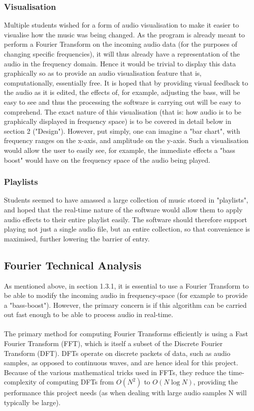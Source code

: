 \subsubsection{Visualisation}
Multiple students wished for a form of audio visualisation to make it easier to visualise how the music was being changed. As the program is already meant to perform a Fourier Transform on the incoming audio data (for the purposes of changing specific frequencies), it will thus already have a representation of the audio in the frequency domain. Hence it would be trivial to display this data graphically so as to provide an audio visualisation feature that is, computationally, essentially free. It is hoped that by providing visual feedback to the audio as it is edited, the effects of, for example, adjusting the bass, will be easy to see and thus the processing the software is carrying out will be easy to comprehend. The exact nature of this visualisation (that is: how audio is to be graphically displayed in frequency space) is to be covered in detail below in section 2 ("Design"). However, put simply, one can imagine  a "bar chart", with frequency ranges on the x-axis, and amplitude on the y-axis. Such a visualisation would allow the user to easily see, for example, the immediate effects a "bass boost" would have on the frequency space of the audio being played.

\subsubsection{Playlists}
Students seemed to have amassed a large collection of music stored in "playlists", and hoped that the real-time nature of the software would allow them to apply audio effects to their entire playlist easily. The software should therefore support playing not just a single audio file, but an entire collection, so that convenience is maximised, further lowering the barrier of entry.

\pagebreak
\subsection{Fourier Technical Analysis}
As mentioned above, in section 1.3.1, it is essential to use a Fourier Transform to be able to modify the incoming audio in frequency-space (for example to provide a "bass-boost"). However, the primary concern is if this algorithm can be carried out fast enough to be able to process audio in real-time.

\paragraph{}
The primary method for computing Fourier Transforms efficiently is using a Fast Fourier Transform (FFT), which is itself a subset of the Discrete Fourier Transform (DFT). DFTs operate on discrete packets of data, such as audio samples, as opposed to continuous waves, and are hence ideal for this project. Because of the various mathematical tricks used in FFTs, they reduce the time-complexity of computing DFTs from \(O(N^2)\) to \(O(N\log{N})\), providing the performance this project needs (as when dealing with large audio samples N will typically be large).

